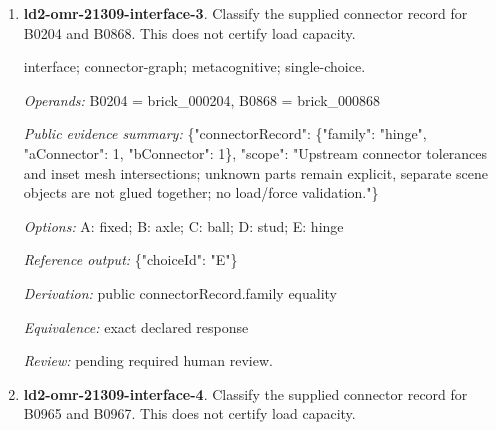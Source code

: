 \begin{enumerate}
\par{\small interface; connector-graph; metacognitive; single-choice.\par\textit{Operands:} B1737 = brick\_001737, B1615 = brick\_001615\par\textit{Public evidence summary:} \{"connectorRecord": \{"family": "ball", "aConnector": 3, "bConnector": 3\}, "scope": "Upstream connector tolerances and inset mesh intersections; unknown parts remain explicit, separate scene objects are not glued together; no load/force validation."\}\par\textit{Options:} A: axle; B: stud; C: fixed; D: ball; E: hinge\par\textit{Reference output:} \{"choiceId": "D"\}\par\textit{Derivation:} public connectorRecord.family equality\par\textit{Equivalence:} exact declared response\par\textit{Review:} machine checks passed; no human certification.}
\item \textbf{ld2-omr-21309-interface-3}. Classify the supplied connector record for B0204 and B0868. This does not certify load capacity.
\par{\small interface; connector-graph; metacognitive; single-choice.\par\textit{Operands:} B0204 = brick\_000204, B0868 = brick\_000868\par\textit{Public evidence summary:} \{"connectorRecord": \{"family": "hinge", "aConnector": 1, "bConnector": 1\}, "scope": "Upstream connector tolerances and inset mesh intersections; unknown parts remain explicit, separate scene objects are not glued together; no load/force validation."\}\par\textit{Options:} A: fixed; B: axle; C: ball; D: stud; E: hinge\par\textit{Reference output:} \{"choiceId": "E"\}\par\textit{Derivation:} public connectorRecord.family equality\par\textit{Equivalence:} exact declared response\par\textit{Review:} pending required human review.}
\item \textbf{ld2-omr-21309-interface-4}. Classify the supplied connector record for B0965 and B0967. This does not certify load capacity.

\end{enumerate}
